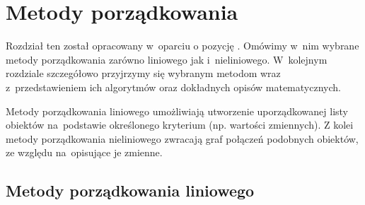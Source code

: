 \documentclass[12pt,a4paper]{report}
\newtheorem{definition}[theorem]{Definicja}
\newtheorem{example}{Przykład}
\begin{document}
%


\chapter{Metody porządkowania}\label{metody porzadkowania}
Rozdział ten został opracowany w~oparciu o pozycję \cite[Rozdział 2]{panek2013}. Omówimy w~nim wybrane metody porządkowania zarówno liniowego jak i~nieliniowego. W~kolejnym rozdziale szczegółowo przyjrzymy się wybranym metodom wraz z~przedstawieniem ich algorytmów oraz dokładnych opisów matematycznych. 

Metody porządkowania liniowego umożliwiają utworzenie uporządkowanej listy obiektów na~podstawie określonego kryterium (np. wartości zmiennych). 
Z kolei metody porządkowania nieliniowego zwracają graf połączeń podobnych obiektów, ze względu na~opisujące je zmienne. 

\section{Metody porządkowania liniowego}
\end{document}
